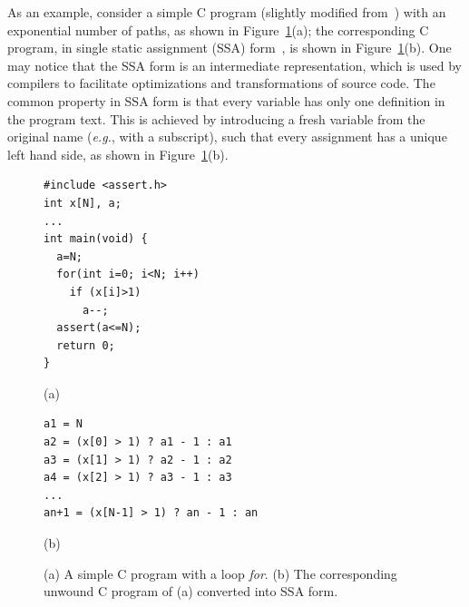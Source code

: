 \documentclass[format=acmsmall, review=false, screen=true]{acmart}
\begin{document}
As an example, consider a simple C program (slightly modified from~\cite{Strichman08}) with an exponential number of paths, as shown in Figure~\ref{figure:verification-condition}(a); the corresponding C program, in single static assignment (SSA) form~\cite{Appel97}, is shown in Figure~\ref{figure:verification-condition}(b). One may notice that the SSA form is an intermediate representation, which is used by compilers to facilitate optimizations and transformations of source code. The common property in SSA form is that every variable has only one definition in the program text. This is achieved by introducing a fresh variable from the original name ({\it e.g.}, with a subscript), such that every assignment has a unique left hand side, as shown in Figure~\ref{figure:verification-condition}(b).
%
\begin{figure}[ht]
\centering
\begin{minipage}{0.45\textwidth}
\begin{lstlisting}
#include <assert.h>
int x[N], a;
...
int main(void) {
  a=N;
  for(int i=0; i<N; i++)
    if (x[i]>1)
      a--;
  assert(a<=N);
  return 0;
}
\end{lstlisting}
\end{minipage}
\begin{center}
(a)
\end{center}
\centering
\begin{minipage}{0.45\textwidth}
\begin{lstlisting}
a1 = N
a2 = (x[0] > 1) ? a1 - 1 : a1
a3 = (x[1] > 1) ? a2 - 1 : a2
a4 = (x[2] > 1) ? a3 - 1 : a3
...
an+1 = (x[N-1] > 1) ? an - 1 : an 
\end{lstlisting}
\end{minipage}
\begin{center}
(b)
\end{center}
\caption{(a) A simple C program with a loop \textit{for}. (b) The corresponding unwound C program of (a) converted into SSA form.} 
\label{figure:verification-condition}
\end{figure}
\end{document}
